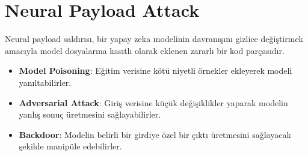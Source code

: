 \section{Neural Payload Attack}

Neural payload saldırısı, bir yapay zeka modelinin davranışını gizlice değiştirmek amacıyla model dosyalarına kasıtlı olarak eklenen zararlı bir kod parçasıdır.

\begin{itemize}
    \item \textbf{Model Poisoning}: Eğitim verisine kötü niyetli örnekler ekleyerek modeli yanıltabilirler.
    \item \textbf{Adversarial Attack}: Giriş verisine küçük değişiklikler yaparak modelin yanlış sonuç üretmesini sağlayabilirler.
    \item \textbf{Backdoor}: Modelin belirli bir girdiye özel bir çıktı üretmesini sağlayacak şekilde manipüle edebilirler.
\end{itemize}


\newpage